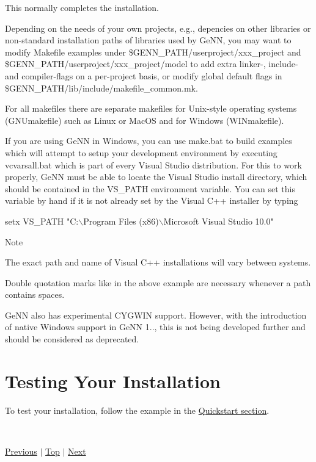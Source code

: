This normally completes the installation.

Depending on the needs of your own projects, e.\+g., depencies on other libraries or non-\/standard installation paths of libraries used by Ge\+N\+N, you may want to modify Makefile examples under {\ttfamily \$\+G\+E\+N\+N\+\_\+\+P\+A\+T\+H/userproject/xxx\+\_\+project} and {\ttfamily \$\+G\+E\+N\+N\+\_\+\+P\+A\+T\+H/userproject/xxx\+\_\+project/model} to add extra linker-\/, include-\/ and compiler-\/flags on a per-\/project basis, or modify global default flags in \$\+G\+E\+N\+N\+\_\+\+P\+A\+T\+H/lib/include/makefile\+\_\+common.mk.

For all makefiles there are separate makefiles for Unix-\/style operating systems (G\+N\+Umakefile) such as Linux or Mac\+O\+S and for Windows (W\+I\+Nmakefile).

If you are using Ge\+N\+N in Windows, you can use make.\+bat to build examples which will attempt to setup your development environment by executing {\ttfamily vcvarsall.\+bat} which is part of every Visual Studio distribution. For this to work properly, Ge\+N\+N must be able to locate the Visual Studio install directory, which should be contained in the {\ttfamily V\+S\+\_\+\+P\+A\+T\+H} environment variable. You can set this variable by hand if it is not already set by the Visual C++ installer by typing 
\begin{DoxyCode}
setx VS\_PATH \textcolor{stringliteral}{"C:\(\backslash\)Program Files (x86)\(\backslash\)Microsoft Visual Studio 10.0"}
\end{DoxyCode}


\begin{DoxyNote}{Note}

\begin{DoxyItemize}
\item The exact path and name of Visual C++ installations will vary between systems.
\item Double quotation marks like in the above example are necessary whenever a path contains spaces.
\end{DoxyItemize}
\end{DoxyNote}
Ge\+N\+N also has experimental C\+Y\+G\+W\+I\+N support. However, with the introduction of native Windows support in Ge\+N\+N 1.., this is not being developed further and should be considered as deprecated.\hypertarget{Installation_testInstall}{}\section{Testing Your Installation}\label{Installation_testInstall}
To test your installation, follow the example in the \hyperlink{Quickstart}{Quickstart section}.

~\newline
 

 \hyperlink{index_Contents}{Previous} $\vert$ \hyperlink{Installation}{Top} $\vert$ \hyperlink{Quickstart}{Next} 